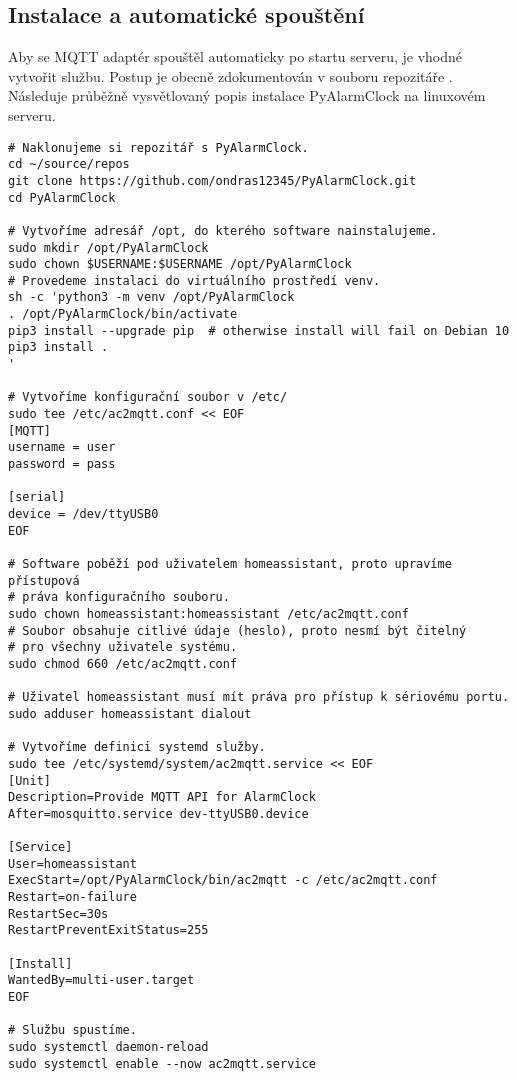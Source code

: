 \subsection{Instalace a automatické spouštění}
Aby se MQTT adaptér spouštěl automaticky po startu serveru, je vhodné vytvořit
 službu. Postup je obecně zdokumentován v souboru
 repozitáře . Následuje průběžně
vysvětlovaný popis instalace PyAlarmClock na linuxovém serveru.
\begin{lstlisting}[language=mybash, style=numbers]
# Naklonujeme si repozitář s PyAlarmClock.
cd ~/source/repos
git clone https://github.com/ondras12345/PyAlarmClock.git
cd PyAlarmClock

# Vytvoříme adresář /opt, do kterého software nainstalujeme.
sudo mkdir /opt/PyAlarmClock
sudo chown $USERNAME:$USERNAME /opt/PyAlarmClock
# Provedeme instalaci do virtuálního prostředí venv.
sh -c 'python3 -m venv /opt/PyAlarmClock
. /opt/PyAlarmClock/bin/activate
pip3 install --upgrade pip  # otherwise install will fail on Debian 10
pip3 install .
'

# Vytvoříme konfigurační soubor v /etc/
sudo tee /etc/ac2mqtt.conf << EOF
[MQTT]
username = user
password = pass

[serial]
device = /dev/ttyUSB0
EOF

# Software poběží pod uživatelem homeassistant, proto upravíme přístupová
# práva konfiguračního souboru.
sudo chown homeassistant:homeassistant /etc/ac2mqtt.conf
# Soubor obsahuje citlivé údaje (heslo), proto nesmí být čitelný
# pro všechny uživatele systému.
sudo chmod 660 /etc/ac2mqtt.conf

# Uživatel homeassistant musí mít práva pro přístup k sériovému portu.
sudo adduser homeassistant dialout

# Vytvoříme definici systemd služby.
sudo tee /etc/systemd/system/ac2mqtt.service << EOF
[Unit]
Description=Provide MQTT API for AlarmClock
After=mosquitto.service dev-ttyUSB0.device

[Service]
User=homeassistant
ExecStart=/opt/PyAlarmClock/bin/ac2mqtt -c /etc/ac2mqtt.conf
Restart=on-failure
RestartSec=30s
RestartPreventExitStatus=255

[Install]
WantedBy=multi-user.target
EOF

# Službu spustíme.
sudo systemctl daemon-reload
sudo systemctl enable --now ac2mqtt.service
\end{lstlisting}

